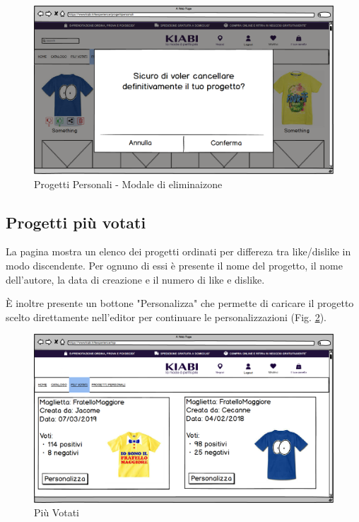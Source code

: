 \documentclass[12pt,italian,]{report}
\begin{document}
\begin{figure}[h]
\centering
\includegraphics{balsamiq/Progetti Personali eliminazione.png}
\caption{Progetti Personali - Modale di eliminaizone}
\label{progetti_personali_delete}
\end{figure}
\clearpage


\newpage
\subsection{Progetti più votati} 

La pagina mostra un elenco dei progetti ordinati per differeza tra like/dislike in modo discendente. Per ognuno di essi è presente il nome del progetto, il nome dell'autore, la data di creazione e il numero di like e dislike.

È inoltre presente un bottone "Personalizza" che permette di caricare il progetto scelto direttamente nell'editor per continuare le personalizzazioni (Fig. \ref{piu_votati}).


\begin{figure}[h]
\centering
\includegraphics{balsamiq/Most Rated.png}
\caption{Più Votati}
\label{piu_votati}
\end{figure}
\end{document}
